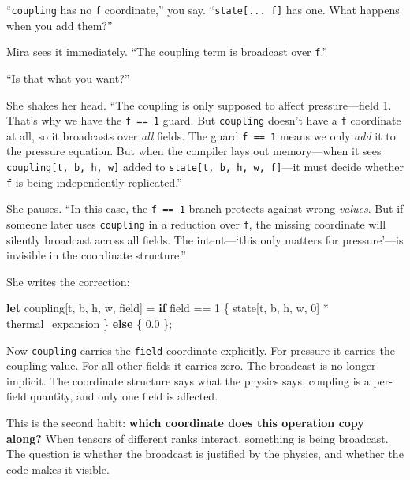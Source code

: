 \documentclass[11pt,]{article}
\newenvironment{Shaded}{}{}
\newcommand{\DecValTok}[1]{\textcolor[rgb]{0.25,0.63,0.44}{#1}}
\newcommand{\KeywordTok}[1]{\textcolor[rgb]{0.00,0.44,0.13}{\textbf{#1}}}
\newcommand{\NormalTok}[1]{#1}
\newcommand{\OperatorTok}[1]{\textcolor[rgb]{0.40,0.40,0.40}{#1}}
\begin{document}
``\texttt{coupling} has no \texttt{f} coordinate,'' you say.
``\texttt{state{[}...\ f{]}} has one. What happens when you add them?''

Mira sees it immediately. ``The coupling term is broadcast over
\texttt{f}.''

``Is that what you want?''

She shakes her head. ``The coupling is only supposed to affect
pressure---field 1. That's why we have the \texttt{f\ ==\ 1} guard. But
\texttt{coupling} doesn't have a \texttt{f} coordinate at all, so it
broadcasts over \emph{all} fields. The guard \texttt{f\ ==\ 1} means we
only \emph{add} it to the pressure equation. But when the compiler lays
out memory---when it sees \texttt{coupling{[}t,\ b,\ h,\ w{]}} added to
\texttt{state{[}t,\ b,\ h,\ w,\ f{]}}---it must decide whether
\texttt{f} is being independently replicated.''

She pauses. ``In this case, the \texttt{f\ ==\ 1} branch protects
against wrong \emph{values}. But if someone later uses \texttt{coupling}
in a reduction over \texttt{f}, the missing coordinate will silently
broadcast across all fields. The intent---`this only matters for
pressure'---is invisible in the coordinate structure.''

She writes the correction:

\begin{Shaded}
\begin{Highlighting}[]
\KeywordTok{let}\NormalTok{ coupling}\OperatorTok{[}\NormalTok{t, b, h, w, field}\OperatorTok{]}\NormalTok{ = }\KeywordTok{if}\NormalTok{ field == }\DecValTok{1}
    \OperatorTok{\{}\NormalTok{ state}\OperatorTok{[}\NormalTok{t, b, h, w, }\DecValTok{0}\OperatorTok{]}\NormalTok{ * thermal_expansion }\OperatorTok{\}}
    \KeywordTok{else} \OperatorTok{\{} \DecValTok{0.0} \OperatorTok{\}}\NormalTok{;}
\end{Highlighting}
\end{Shaded}

Now \texttt{coupling} carries the \texttt{field} coordinate explicitly.
For pressure it carries the coupling value. For all other fields it
carries zero. The broadcast is no longer implicit. The coordinate
structure says what the physics says: coupling is a per-field quantity,
and only one field is affected.

This is the second habit: \textbf{which coordinate does this operation
copy along?} When tensors of different ranks interact, something is
being broadcast. The question is whether the broadcast is justified by
the physics, and whether the code makes it visible.
\end{document}

